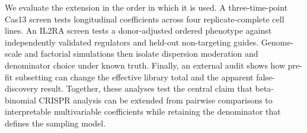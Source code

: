 We evaluate the extension in the order in which it is used.  A
three-time-point Cas13 screen tests longitudinal coefficients across four
replicate-complete cell lines.  An IL2RA screen tests a donor-adjusted ordered
phenotype against independently validated regulators and held-out
non-targeting guides.  Genome-scale and factorial simulations then isolate
dispersion moderation and denominator choice under known truth.  Finally, an
external audit shows how pre-fit subsetting can change the effective library
total and the apparent false-discovery result.  Together, these analyses test
the central claim that beta-binomial CRISPR analysis can be extended from
pairwise comparisons to interpretable multivariable coefficients while
retaining the denominator that defines the sampling model.

